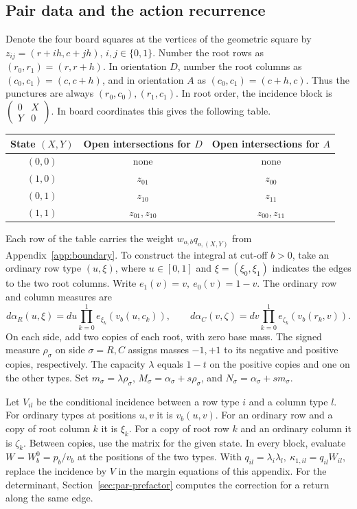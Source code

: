 \subsection{Pair data and the action recurrence}\label{sec:par-accion}

Denote the four board squares at the vertices of the geometric square by \(z_{ij}=(r+ih,c+jh)\),
\(i,j\in\{0,1\}\). Number the root rows as \((r_0,r_1)=(r,r+h)\). In orientation \(D\), number the root
columns as \((c_0,c_1)=(c,c+h)\), and in orientation \(A\) as \((c_0,c_1)=(c+h,c)\). Thus the punctures
are always \((r_0,c_0),(r_1,c_1)\). In root order, the incidence block is
\(\left(\begin{smallmatrix}0&X\\Y&0\end{smallmatrix}\right)\). In board coordinates this gives the
following table. \begin{center} \begin{tabular}{@{}ccc@{}} \toprule State \((X,Y)\) & Open intersections
for \(D\) & Open intersections for \(A\)\\ \midrule \((0,0)\)& none & none\\ \((1,0)\)& \(z_{01}\) &
\(z_{00}\)\\ \((0,1)\)& \(z_{10}\) & \(z_{11}\)\\ \((1,1)\)& \(z_{01},z_{10}\) & \(z_{00},z_{11}\)\\
\bottomrule \end{tabular} \end{center} Each row of the table carries the weight \(w_{o,b}q_{o,(X,Y)}\)
from Appendix~\ref{app:boundary}. To construct the integral at cut-off \(b>0\), take an ordinary row type
\((u,\xi)\), where \(u\in[0,1]\) and \(\xi=(\xi_0,\xi_1)\) indicates the edges to the two root columns.
Write \(e_1(v)=v,\ e_0(v)=1-v\). The ordinary row and column measures are \[
 d\alpha_R(u,\xi)=du\prod_{k=0}^1 e_{\xi_k}(v_b(u,c_k)),\qquad
 d\alpha_C(v,\zeta)=dv\prod_{k=0}^1 e_{\zeta_k}(v_b(r_k,v)).
\] On each side, add two copies of each root, with zero base mass. The signed measure \(\rho_\sigma\)
on side \(\sigma=R,C\) assigns masses \(-1,+1\) to its negative and positive copies, respectively. The
capacity \(\lambda\) equals \(1-t\) on the positive copies and one on the other types. Set
\(m_\sigma=\lambda\rho_\sigma\), \(M_\sigma=\alpha_\sigma+s\rho_\sigma\), and \(N_\sigma=\alpha_\sigma+s
m_\sigma\).

Let \(V_{il}\) be the conditional incidence between a row type \(i\) and a column type \(l\). For
ordinary types at positions \(u,v\) it is \(v_b(u,v)\). For an ordinary row and a copy of root column
\(k\) it is \(\xi_k\). For a copy of root row \(k\) and an ordinary column it is \(\zeta_k\). Between
copies, use the matrix for the given state. In every block, evaluate \(W=W_b^0=p_b/v_b\) at the positions
of the two types. With \(q_{il}=\lambda_i\lambda_l,\ \kappa_{1,il}=q_{il}W_{il}\), replace the incidence
by \(V\) in the margin equations of this appendix. For the determinant, Section~\ref{sec:par-prefactor}
computes the correction for a return along the same edge.

